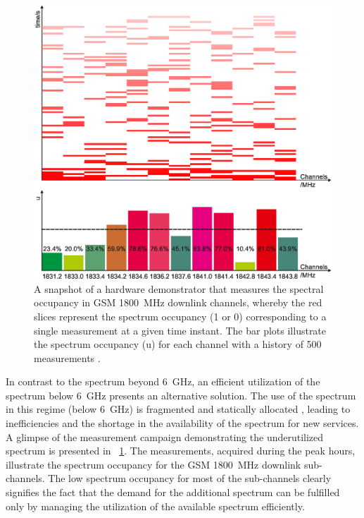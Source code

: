 \begin{figure}[!t]
\centering
\includegraphics[width = \figscalett]{figures/Grafik_Poster}
\caption{A snapshot of a hardware demonstrator that measures the spectral occupancy in GSM \SI{1800}{MHz} downlink channels, whereby the red slices represent the spectrum occupancy (1 or 0) corresponding to a single measurement at a given time instant. The bar plots illustrate the spectrum occupancy (u) for each channel with a history of 500 measurements \protect\cite{Kaushik13}.}
\label{fig_Int:HW_I}
\end{figure}
In contrast to the spectrum beyond \SI{6}{GHz}, an efficient utilization of the spectrum below \SI{6}{GHz} presents an alternative solution. The use of the spectrum in this regime (below \SI{6}{GHz}) is fragmented and statically allocated \cite{Mchen05, Mchen07}, leading to inefficiencies and the shortage in the availability of the spectrum for new services. A glimpse of the measurement campaign demonstrating the underutilized spectrum is presented in \figurename~\ref{fig_Int:HW_I}. The measurements, acquired during the peak hours, illustrate the spectrum occupancy for the GSM \SI{1800}{MHz} downlink sub-channels. The low spectrum occupancy for most of the sub-channels clearly signifies the fact that the demand for the additional spectrum can be fulfilled only by managing the utilization of the available spectrum efficiently.

